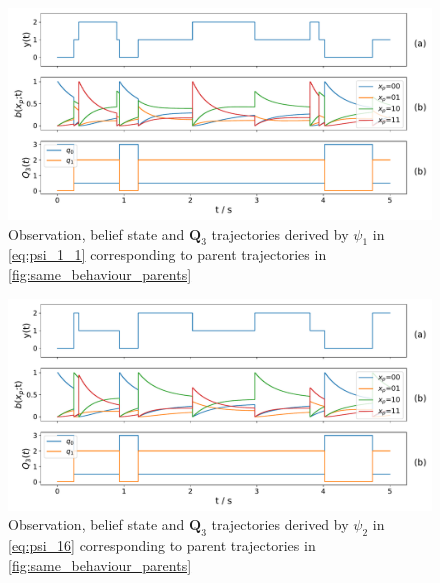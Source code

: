 \begin{figure}[H]
	\begin{center}
		\includegraphics[width=.90\textwidth]{figures/equivalence_classes/same_behaviour/psi_0}
		\caption{Observation, belief state and $ \textbf{Q}_3 $ trajectories derived by $ \psi_1 $ in \autoref{eq:psi_1_1} corresponding to parent trajectories in \autoref{fig:same_behaviour_parents}}
		\label{fig:same_behaviour_psi_0}
	\end{center}
\end{figure}
\begin{figure}[H]
	\begin{center}
		\includegraphics[width=.90\textwidth]{figures/equivalence_classes/same_behaviour/psi_16}
		\caption{Observation, belief state and $ \textbf{Q}_3 $ trajectories derived by $ \psi_2 $ in \autoref{eq:psi_16} corresponding to parent trajectories in \autoref{fig:same_behaviour_parents}}
		\label{fig:same_behaviour_psi_16}
	\end{center}
\end{figure}

